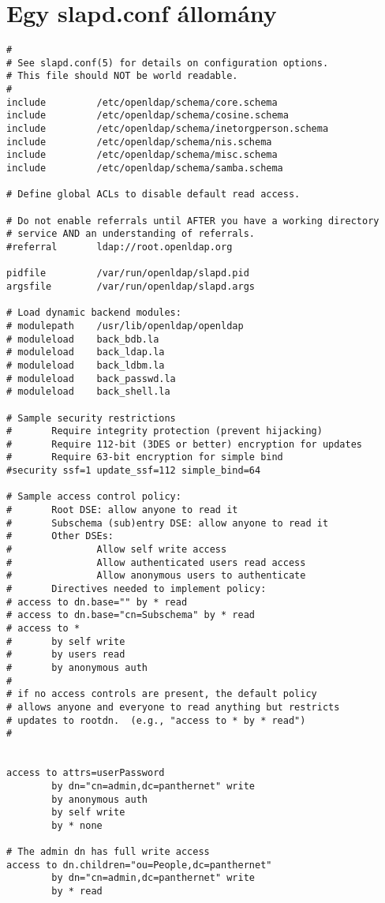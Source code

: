 \chapter{Egy slapd.conf állomány}
\begin{Verbatim}
#
# See slapd.conf(5) for details on configuration options.
# This file should NOT be world readable.
#
include         /etc/openldap/schema/core.schema
include         /etc/openldap/schema/cosine.schema
include         /etc/openldap/schema/inetorgperson.schema
include         /etc/openldap/schema/nis.schema
include         /etc/openldap/schema/misc.schema
include         /etc/openldap/schema/samba.schema

# Define global ACLs to disable default read access.

# Do not enable referrals until AFTER you have a working directory
# service AND an understanding of referrals.
#referral       ldap://root.openldap.org

pidfile         /var/run/openldap/slapd.pid
argsfile        /var/run/openldap/slapd.args

# Load dynamic backend modules:
# modulepath    /usr/lib/openldap/openldap
# moduleload    back_bdb.la
# moduleload    back_ldap.la
# moduleload    back_ldbm.la
# moduleload    back_passwd.la
# moduleload    back_shell.la

# Sample security restrictions
#       Require integrity protection (prevent hijacking)
#       Require 112-bit (3DES or better) encryption for updates
#       Require 63-bit encryption for simple bind
#security ssf=1 update_ssf=112 simple_bind=64

# Sample access control policy:
#       Root DSE: allow anyone to read it
#       Subschema (sub)entry DSE: allow anyone to read it
#       Other DSEs:
#               Allow self write access
#               Allow authenticated users read access
#               Allow anonymous users to authenticate
#       Directives needed to implement policy:
# access to dn.base="" by * read
# access to dn.base="cn=Subschema" by * read
# access to *
#       by self write
#       by users read
#       by anonymous auth
#
# if no access controls are present, the default policy
# allows anyone and everyone to read anything but restricts
# updates to rootdn.  (e.g., "access to * by * read")
#


access to attrs=userPassword
        by dn="cn=admin,dc=panthernet" write
        by anonymous auth
        by self write
        by * none

# The admin dn has full write access
access to dn.children="ou=People,dc=panthernet"
        by dn="cn=admin,dc=panthernet" write
        by * read



\end{Verbatim}
